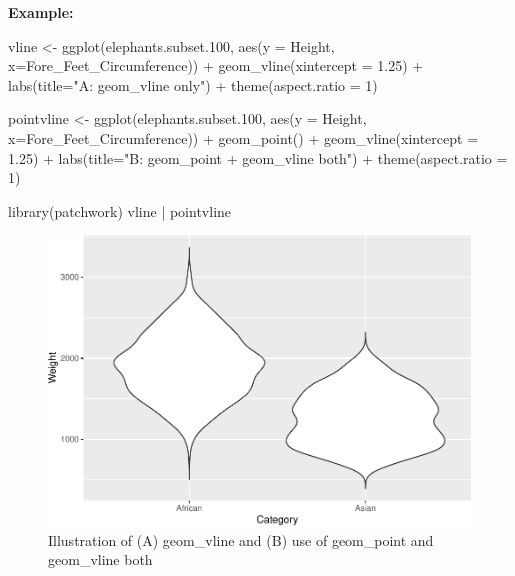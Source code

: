 \documentclass[
]{book}
\newenvironment{Shaded}{\begin{snugshade}}{\end{snugshade}}
\newcommand{\AttributeTok}[1]{\textcolor[rgb]{0.77,0.63,0.00}{#1}}
\newcommand{\DecValTok}[1]{\textcolor[rgb]{0.00,0.00,0.81}{#1}}
\newcommand{\FloatTok}[1]{\textcolor[rgb]{0.00,0.00,0.81}{#1}}
\newcommand{\FunctionTok}[1]{\textcolor[rgb]{0.00,0.00,0.00}{#1}}
\newcommand{\NormalTok}[1]{#1}
\newcommand{\OtherTok}[1]{\textcolor[rgb]{0.56,0.35,0.01}{#1}}
\newcommand{\SpecialCharTok}[1]{\textcolor[rgb]{0.00,0.00,0.00}{#1}}
\newcommand{\StringTok}[1]{\textcolor[rgb]{0.31,0.60,0.02}{#1}}
\begin{document}
\textbf{Example:}

\begin{Shaded}
\begin{Highlighting}[]
\NormalTok{vline }\OtherTok{\textless{}{-}} \FunctionTok{ggplot}\NormalTok{(elephants.subset}\FloatTok{.100}\NormalTok{, }\FunctionTok{aes}\NormalTok{(}\AttributeTok{y =}\NormalTok{ Height, }\AttributeTok{x=}\NormalTok{Fore\_Feet\_Circumference)) }\SpecialCharTok{+} \FunctionTok{geom\_vline}\NormalTok{(}\AttributeTok{xintercept =} \FloatTok{1.25}\NormalTok{) }\SpecialCharTok{+} 
  \FunctionTok{labs}\NormalTok{(}\AttributeTok{title=}\StringTok{"A: \textasciigrave{}geom\_vline\textasciigrave{} only"}\NormalTok{) }\SpecialCharTok{+}
  \FunctionTok{theme}\NormalTok{(}\AttributeTok{aspect.ratio =} \DecValTok{1}\NormalTok{)}

\NormalTok{pointvline }\OtherTok{\textless{}{-}} \FunctionTok{ggplot}\NormalTok{(elephants.subset}\FloatTok{.100}\NormalTok{, }\FunctionTok{aes}\NormalTok{(}\AttributeTok{y =}\NormalTok{ Height, }\AttributeTok{x=}\NormalTok{Fore\_Feet\_Circumference)) }\SpecialCharTok{+} 
  \FunctionTok{geom\_point}\NormalTok{() }\SpecialCharTok{+} 
  \FunctionTok{geom\_vline}\NormalTok{(}\AttributeTok{xintercept =} \FloatTok{1.25}\NormalTok{) }\SpecialCharTok{+} 
  \FunctionTok{labs}\NormalTok{(}\AttributeTok{title=}\StringTok{"B: \textasciigrave{}geom\_point + geom\_vline\textasciigrave{} both"}\NormalTok{) }\SpecialCharTok{+}
  \FunctionTok{theme}\NormalTok{(}\AttributeTok{aspect.ratio =} \DecValTok{1}\NormalTok{)}

\FunctionTok{library}\NormalTok{(patchwork)}
\NormalTok{vline }\SpecialCharTok{|}\NormalTok{ pointvline}
\end{Highlighting}
\end{Shaded}

\begin{figure}
\centering
\includegraphics{Data-Visualisation-geom-Encyclopedia_files/figure-latex/unnamed-chunk-52-1.pdf}
\caption{\label{fig:unnamed-chunk-52}Illustration of (A) geom\_vline and (B) use of geom\_point and geom\_vline both}
\end{figure}
\end{document}
